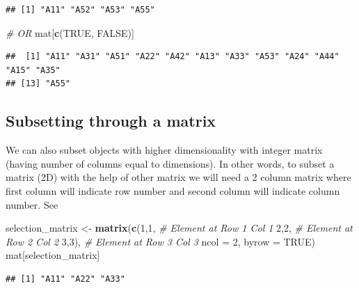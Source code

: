 \documentclass[
]{book}
\newenvironment{Shaded}{\begin{snugshade}}{\end{snugshade}}
\newcommand{\AttributeTok}[1]{\textcolor[rgb]{0.13,0.29,0.53}{#1}}
\newcommand{\CommentTok}[1]{\textcolor[rgb]{0.56,0.35,0.01}{\textit{#1}}}
\newcommand{\ConstantTok}[1]{\textcolor[rgb]{0.56,0.35,0.01}{#1}}
\newcommand{\DecValTok}[1]{\textcolor[rgb]{0.00,0.00,0.81}{#1}}
\newcommand{\FunctionTok}[1]{\textcolor[rgb]{0.13,0.29,0.53}{\textbf{#1}}}
\newcommand{\NormalTok}[1]{#1}
\newcommand{\OtherTok}[1]{\textcolor[rgb]{0.56,0.35,0.01}{#1}}
\begin{document}
\begin{verbatim}
## [1] "A11" "A52" "A53" "A55"
\end{verbatim}

\begin{Shaded}
\begin{Highlighting}[]
\CommentTok{\# OR}
\NormalTok{mat[}\FunctionTok{c}\NormalTok{(}\ConstantTok{TRUE}\NormalTok{, }\ConstantTok{FALSE}\NormalTok{)]}
\end{Highlighting}
\end{Shaded}

\begin{verbatim}
##  [1] "A11" "A31" "A51" "A22" "A42" "A13" "A33" "A53" "A24" "A44" "A15" "A35"
## [13] "A55"
\end{verbatim}

\hypertarget{subsetting-through-a-matrix}{%
\subsection{Subsetting through a matrix}\label{subsetting-through-a-matrix}}

We can also subset objects with higher dimensionality with integer matrix (having number of columns equal to dimensions). In other words, to subset a matrix (2D) with the help of other matrix we will need a 2 column matrix where first column will indicate row number and second column will indicate column number. See

\begin{Shaded}
\begin{Highlighting}[]
\NormalTok{selection\_matrix }\OtherTok{\textless{}{-}} \FunctionTok{matrix}\NormalTok{(}\FunctionTok{c}\NormalTok{(}\DecValTok{1}\NormalTok{,}\DecValTok{1}\NormalTok{, }\CommentTok{\# Element at Row 1 Col 1}
                             \DecValTok{2}\NormalTok{,}\DecValTok{2}\NormalTok{, }\CommentTok{\# Element at Row 2 Col 2}
                             \DecValTok{3}\NormalTok{,}\DecValTok{3}\NormalTok{), }\CommentTok{\# Element at Row 3 Col 3}
                           \AttributeTok{ncol =} \DecValTok{2}\NormalTok{, }
                           \AttributeTok{byrow =} \ConstantTok{TRUE}\NormalTok{)}
\NormalTok{mat[selection\_matrix]}
\end{Highlighting}
\end{Shaded}

\begin{verbatim}
## [1] "A11" "A22" "A33"
\end{verbatim}
\end{document}
